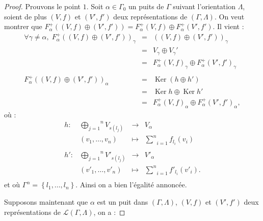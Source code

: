 \documentclass[a4paper,10pt]{article}
\DeclareMathOperator{\Ker}{Ker}
\begin{document}
\begin{proof}
	Prouvons le point $1$. Soit $\alpha\in\Gamma_{0}$ un puits de $\Gamma$ suivant l'orientation $\Lambda$, soient de plus $(V,f)$ et $(V',f')$ deux représentations de $(\Gamma,\Lambda)$. On veut montrer que $F_{\alpha}^{+}((V,f)\oplus(V',f'))=F_{\alpha}^{+}(V,f)\oplus F_{\alpha}^{+}(V',f')$. Il vient :
	\[
\begin{array}{rll}
	\forall\gamma\neq\alpha,\;F_{\alpha}^{+}((V,f)\oplus(V',f'))_{\gamma}&=&((V,f)\oplus(V',f'))_{\gamma}\\
	&=& V_{\gamma}\oplus V_{\gamma}'\\
	&=&  F_{\alpha}^{+}(V,f)_{\gamma}\oplus F_{\alpha}^{+}(V',f')_{\gamma}\\
	&&\\
	F_{\alpha}^{+}((V,f)\oplus(V',f'))_{\alpha}&=&\Ker(h\oplus h')\\
	&=& \Ker h \oplus \Ker h'\\
	&=&  F_{\alpha}^{+}(V,f)_{\alpha}\oplus F_{\alpha}^{+}(V',f')_{\alpha},
\end{array}
	\]
où :
\[
\begin{array}{lccc}
	h : & \overset{n}{\underset{j=1}{\bigoplus}}V_{s(l_{j})}&\rightarrow & V_{\alpha} \\ 
	& (v_{1},\dots,v_{n})&\mapsto & \underset{i=1}{\overset{n}{\sum}}f_{l_{i}}(v_{i})\\
	&&&\\
	h' : & \overset{n}{\underset{j=1}{\bigoplus}}V'_{s(l_{j})}&\rightarrow & V'_{\alpha} \\ 
	& (v'_{1},\dots,v'_{n})&\mapsto & \underset{i=1}{\overset{n}{\sum}}f'_{l_{i}}(v'_{i}).\\
\end{array}
	\]
	et où $\Gamma^{\alpha}=\left\{ l_{1},\dots,l_{n} \right\}$. Ainsi on a bien l'égalité annoncée.

Supposons maintenant que $\alpha$ est un puit dans $(\Gamma,\Lambda)$, $(V,f)$ et $(V',f')$ deux représentations de $\mathscr L(\Gamma,\Lambda)$, on a : 


\end{proof}
\end{document}
